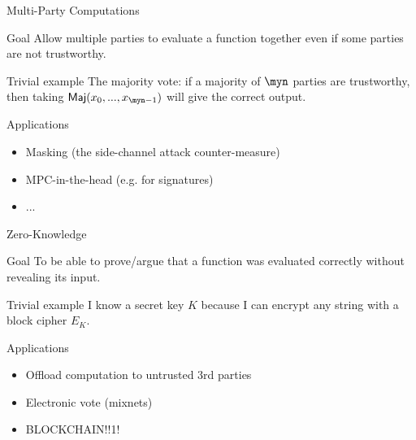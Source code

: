 \documentclass[presentation,aspectratio=1610]{beamer}
\begin{document}
\begin{frame}{Multi-Party Computations}
  \begin{exampleblock}{Goal}
    Allow multiple parties to evaluate a function together even if some parties are not trustworthy.
  \end{exampleblock}

  \pause
  
  \begin{alertblock}{Trivial example}
    The majority vote: if a majority of $\myn$ parties are trustworthy, then taking $\mathsf{Maj}(x_0,...,x_{\myn-1})$ will give the correct output.
  \end{alertblock}

  \pause

  \begin{block}{Applications}
    \begin{itemize}
    \item Masking (the side-channel attack counter-measure)
    \item MPC-in-the-head (e.g. for signatures)
    \item ...
    \end{itemize}
  \end{block}
\end{frame}




\begin{frame}{Zero-Knowledge}
  \begin{exampleblock}{Goal}
    To be able to prove/argue that a function was evaluated correctly
    without revealing its input.
  \end{exampleblock}

  \pause

  \begin{alertblock}{Trivial example}
    I know a secret key $K$ because I can encrypt any string with a block cipher $E_K$.
  \end{alertblock}

  \pause
  
  \begin{block}{Applications}
    \begin{itemize}
    \item Offload computation to untrusted 3rd parties
    \item Electronic vote (mixnets)
      \pause
    \item BLOCKCHAIN!!1!
    \end{itemize}
  \end{block}
\end{frame}
\end{document}

